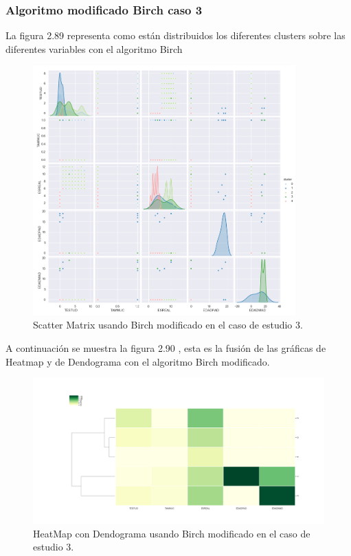 	\subsubsection{Algoritmo modificado Birch caso 3} 

	La figura 2.89 representa como están distribuidos los diferentes clusters sobre las diferentes variables con el 
	algoritmo Birch\\

	\begin{figure}[htb]
		\centering
		\includegraphics[width=0.9\textwidth]{./imagenes/caso3/scatterMatrix_caso3_Birch_modificado}
		\caption{Scatter Matrix usando Birch modificado en el caso de estudio 3.} \label{fig:1}
	\end{figure}
	
	A continuación se muestra la figura 2.90 , esta es la fusión de las gráficas de 
	Heatmap y de Dendograma con el algoritmo Birch modificado.  \\

	\begin{figure}[htb]
		\centering
		\includegraphics[width=1.0\textwidth]{./imagenes/caso3/heatmapcondendograma_caso3_Birch_modificado}
		\caption{HeatMap con Dendograma usando Birch modificado en el caso de estudio 3.} \label{fig:1}
	\end{figure}

